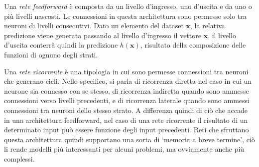 \documentclass[../../main.tex]{subfiles}
\begin{document}
Una \textit{rete feedforward} è composta da un livello d'ingresso, uno d'uscita e da uno o più livelli nascosti. Le connessioni in questa architettura sono permesse solo tra neuroni di livelli consecutivi. Dato un elemento del dataset $\boldsymbol{x}$, la relativa predizione viene generata passando al livello d'ingresso il vettore $\boldsymbol{x}$, il livello d'uscita conterrà quindi la predizione $h(\boldsymbol{x})$, risultato della composizione delle funzioni di ognuno degli strati.

Una \textit{rete ricorrente} è una tipologia in cui sono permesse connessioni tra neuroni che generano cicli. Nello specifico, si parla di ricorrenza diretta nel caso in cui un neurone sia connesso con se stesso, di ricorrenza indiretta quando sono ammesse connessioni verso livelli precedenti, e di ricorrenza laterale quando sono ammessi connessioni tra neuroni dello stesso strato. A differenza quindi di ciò che accade in una architettura feedforward, nel caso di una rete ricorrente il risultato di un determinato input può essere funzione degli input precedenti. Reti che sfruttano questa architettura quindi supportano una sorta di `memoria a breve termine', ciò li rende modelli più interessanti per alcuni problemi, ma ovviamente anche più complessi.
\end{document}
